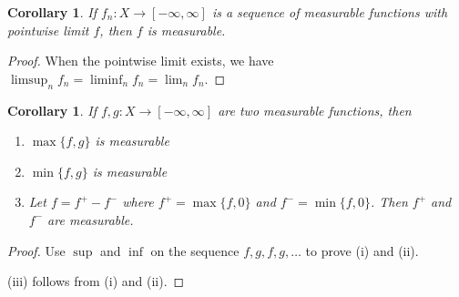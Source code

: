 \documentclass[11pt]{amsart}
\newtheorem{corollary}[theorem]{Corollary}
\theoremstyle{definition}
\numberwithin{equation}{section}
\begin{document}
\begin{corollary}
    If $f_n:X\to[-\infty,\infty]$ is a sequence of measurable functions with pointwise limit $f$, then $f$ is measurable.
\end{corollary}
\begin{proof}
    When the pointwise limit exists, we have $\limsup_nf_n=\liminf_nf_n=\lim_nf_n$.
\end{proof}
\begin{corollary}
    If $f,g:X\to[-\infty,\infty]$ are two measurable functions, then
    \begin{enumerate}
        \item [(i)] $\max\{f,g\}$ is measurable
        \item [(ii)] $\min\{f,g\}$ is measurable
        \item [(iii)] Let $f=f^+-f^-$ where $f^+=\max\{f,0\}$ and $f^-=\min\{f,0\}$. Then $f^+$ and $f^-$ are measurable.
    \end{enumerate}
\end{corollary}
\begin{proof}
    Use $\sup$ and $\inf$ on the sequence $f,g,f,g,\ldots$ to prove (i) and (ii).

    (iii) follows from (i) and (ii).
\end{proof}
\end{document}
